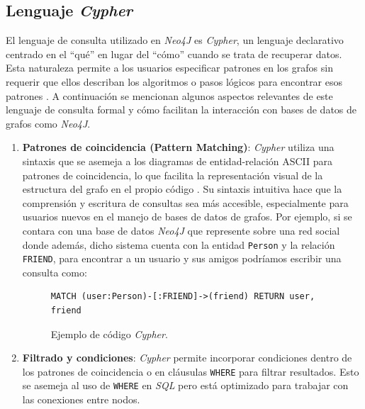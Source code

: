 \subsection{Lenguaje \textit{Cypher}} \label{cypher_language}

El lenguaje de consulta utilizado en \textit{Neo4J} es \textit{Cypher}, un lenguaje declarativo centrado en el ``qué'' en lugar del ``cómo'' cuando se trata de recuperar datos. Esta naturaleza permite a los usuarios especificar patrones en los grafos sin requerir que ellos describan los algoritmos o pasos lógicos para encontrar esos patrones \cite{cypher}. A continuación se mencionan algunos aspectos relevantes de este lenguaje de consulta formal y cómo facilitan la interacción con bases de datos de grafos como \textit{Neo4J}.

\begin{enumerate}

\item \textbf{Patrones de coincidencia (Pattern Matching)}:
\textit{Cypher} utiliza una sintaxis que se asemeja a los diagramas de entidad-relación ASCII para patrones de coincidencia, lo que facilita la representación visual de la estructura del grafo en el propio código \cite{millerandrodriguez2013}. Su sintaxis intuitiva hace que la comprensión y escritura de consultas sea más accesible, especialmente para usuarios nuevos en el manejo de bases de datos de grafos. Por ejemplo, si se contara con una base de datos \textit{Neo4J} que represente sobre una red social donde además, dicho sistema cuenta con la entidad \texttt{Person} y la relación \texttt{FRIEND}, para encontrar a un usuario y sus amigos podríamos escribir una consulta como:

\begin{figure}[H]
\begin{center}
\begin{lstlisting}[language=cypher]
MATCH (user:Person)-[:FRIEND]->(friend) RETURN user, friend
\end{lstlisting}
\caption{Ejemplo de código \textit{Cypher}.}
\end{center}
\end{figure}

\item \textbf{Filtrado y condiciones}: \textit{Cypher} permite incorporar condiciones dentro de los patrones de coincidencia o en cláusulas \texttt{WHERE} para filtrar resultados. Esto se asemeja al uso de \texttt{WHERE} en \textit{SQL} pero está optimizado para trabajar con las conexiones entre nodos.


\end{enumerate}
